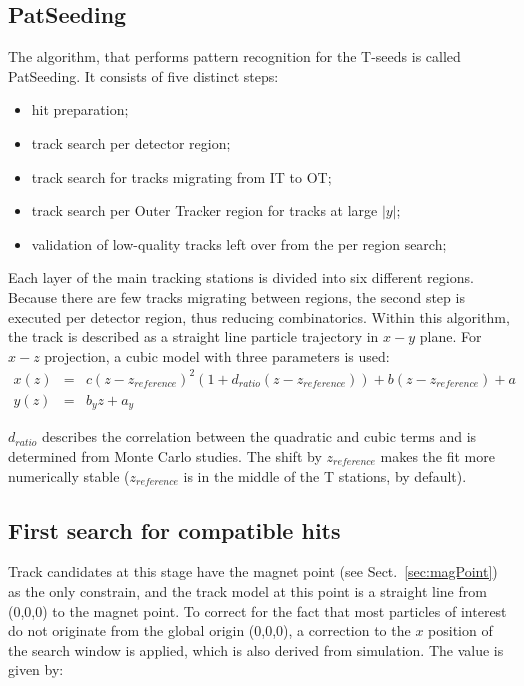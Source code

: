 \subsection{PatSeeding}
The algorithm, that performs pattern recognition for the T-seeds is called PatSeeding. It consists of five distinct steps: 

\begin{itemize}
\item hit preparation;
\item track search per detector region;
\item track search for tracks migrating from IT to OT;
\item track search per Outer Tracker region for tracks at large $|y|$;
\item validation of low-quality tracks left over from the per region search;
\end{itemize}


Each layer of the main tracking stations is divided into six different regions. Because there
are few tracks migrating between regions, the second step is executed per detector region, thus reducing combinatorics. Within this algorithm, the track is described as a straight line particle trajectory in $x-y$ plane.  For $x-z$ projection, a cubic model with three parameters is used:
\begin{eqnarray}
x(z)&=&c(z-z_{reference})^2(1+d_{ratio}(z-z_{reference})) + b(z-z_{reference})+a \\
y(z)&=&b_{y}z+a_y
\end{eqnarray}

$d_{ratio}$ describes the correlation between the quadratic and cubic terms and is determined from
Monte Carlo studies. The shift by $z_{reference}$ makes the fit more numerically stable ($z_{reference}$ is
in the middle of the T stations, by default).

\subsection{First search for compatible hits}
Track candidates at this stage have the magnet point  (see Sect.~\ref{sec:magPoint}) as the only constrain,
 and the track model at this point is a straight line from (0,0,0) to the magnet point.
To correct for the fact that most particles of interest do not originate from
the global \lhcb origin (0,0,0), a correction to the $x$ position of the search
window is applied, which is also derived from simulation. The value is given by:

